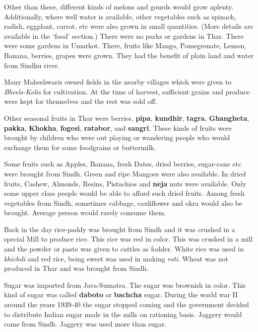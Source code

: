 Other than these, different kinds of melons and gourds would grow aplenty.
Additionally, where well water is available, other vegetables such as spinach,
radish, eggplant, carrot, etc were also grown in small quantities. (More
details are available in the `food' section.) There were no parks or gardens in
Thar. There were some gardens in Umarkot. There, fruits like Mango,
Pomegrenate, Lemon, Banana, berries, grapes were grown. They had the benefit of
plain land and water from Sindhu river.

Many Maheshwaris owned fields in the nearby villages which were given to
\textit{Bheels-Kolis} for cultivation. At the time of harvest, sufficient
grains and produce were kept for themselves and the rest was sold off. 

Other seasonal fruits in Thar were berries, \textbf{pipa}, \textbf{kundhir},
\textbf{tagra}, \textbf{Ghangheta}, \textbf{pakka}, \textbf{Khokha},
\textbf{fogesi}, \textbf{ratabor}, and \textbf{sangri}. These kinds of fruits
were brought by children who were out playing or wandering people who would
exchange them for some foodgrains or buttermilk.

Some fruits such as Apples, Banana, fresh Dates, dried berries, sugar-cane etc
were brought from Sindh. Green and ripe Mangoes were also available. In dried
fruits, Cashew, Almonds, Resins, Pistachios and \textbf{neja} nuts were
available. Only some upper class people would be able to afford such dried
fruits. Among fresh vegetables from Sindh, sometimes cabbage, cauliflower and
okra would also be brought. Average person would rarely consume them.

Back in the day rice-paddy was brought from Sindh and it was crushed in a
special Mill to produce rice. This rice was red in color. This was crushed in a
mill and the powder or paste was given to cattles as fodder. White rice was
used in \textit{khichdi} and red rice, being sweet was used in making
\textit{roti}. Wheat was not produced in Thar and was brought from Sindh. 

Sugar was imported from Java-Sumatra. The sugar was brownish in color. This
kind of sugar was called \textbf{daboto} or \textbf{bachcha} sugar. During the
world war II around the years 1939-40 the sugar stopped coming and the
government decided to distribute Indian sugar made in the mills on rationing
basis. Jaggery would come from Sindh. Jaggery was used more than sugar.

